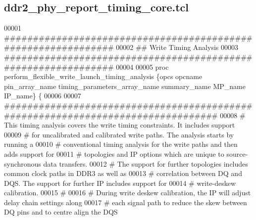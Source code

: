 \subsection{ddr2\+\_\+phy\+\_\+report\+\_\+timing\+\_\+core.\+tcl}
\label{ddr2__phy__report__timing__core_8tcl_source}

\begin{DoxyCode}
00001 \textcolor{comment}{##############################################################}
00002 \textcolor{comment}{}\textcolor{comment}{## Write Timing Analysis}
00003 \textcolor{comment}{}\textcolor{comment}{##############################################################}
00004 \textcolor{comment}{}
00005 \textcolor{keyword}{proc} perform\_flexible\_write\_launch\_timing\_analysis \{opcs opcname pin\_array\_name
       timing\_parameters\_array\_name summary\_name MP\_name IP\_name\} \{
00006 
00007    \textcolor{comment}{################################################################################}
00008 \textcolor{comment}{}\textcolor{comment}{   }\textcolor{comment}{# This timing analysis covers the write timing constraints.  It includes support }
00009 \textcolor{comment}{}\textcolor{comment}{   }\textcolor{comment}{# for uncalibrated and calibrated write paths.  The analysis starts by running a }
00010 \textcolor{comment}{}\textcolor{comment}{   }\textcolor{comment}{# conventional timing analysis for the write paths and then adds support for }
00011 \textcolor{comment}{}\textcolor{comment}{   }\textcolor{comment}{# topologies and IP options which are unique to source-synchronous data transfers.  }
00012 \textcolor{comment}{}\textcolor{comment}{   }\textcolor{comment}{# The support for further topologies includes common clock paths in DDR3 as well as }
00013 \textcolor{comment}{}\textcolor{comment}{   }\textcolor{comment}{# correlation between DQ and DQS.  The support for further IP includes support for }
00014 \textcolor{comment}{}\textcolor{comment}{   }\textcolor{comment}{# write-deskew calibration.}
00015 \textcolor{comment}{}\textcolor{comment}{   }\textcolor{comment}{# }
00016 \textcolor{comment}{}\textcolor{comment}{   }\textcolor{comment}{# During write deskew calibration, the IP will adjust delay chain settings along }
00017 \textcolor{comment}{}\textcolor{comment}{   }\textcolor{comment}{# each signal path to reduce the skew between DQ pins and to centre align the DQS }

\end{DoxyCode}
